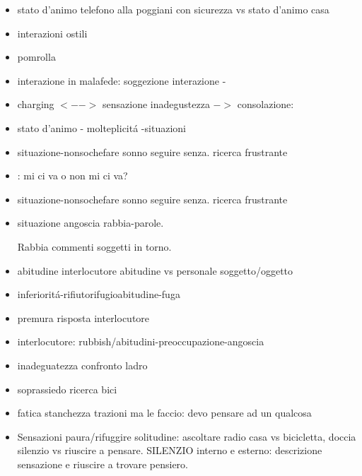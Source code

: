 \begin{itemize}

\item stato d'animo telefono alla poggiani con sicurezza vs stato d'animo casa

\item interazioni ostili

\item pomrolla

\item interazione in malafede: soggezione interazione - 

\item charging $<-->$ sensazione inadegustezza $->$ consolazione:  

\item stato d'animo - molteplicit\'a -situazioni

\item situazione-nonsochefare sonno seguire senza. ricerca frustrante

\item {}: mi ci va o non mi ci va?

\item situazione-nonsochefare sonno seguire senza. ricerca frustrante

\item situazione angoscia rabbia-parole.

Rabbia commenti soggetti in torno.

\item abitudine interlocutore abitudine vs personale soggetto/oggetto

\item inferiorit\'a-rifiutorifugioabitudine-fuga

\item premura risposta interlocutore

\item interlocutore: rubbish/abitudini-preoccupazione-angoscia

\item inadeguatezza confronto ladro

\item soprassiedo ricerca bici

\item fatica stanchezza trazioni ma le faccio: devo pensare ad un qualcosa

\item Sensazioni paura/rifuggire solitudine: ascoltare radio casa vs bicicletta, doccia silenzio vs riuscire a pensare. SILENZIO interno e esterno: descrizione sensazione e riuscire a trovare pensiero.

\end{itemize}


